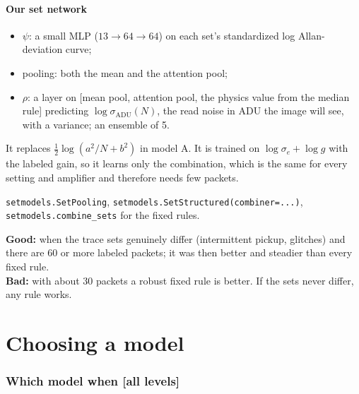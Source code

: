 \documentclass[11pt]{article}
\newcommand{\code}[1]{\texttt{#1}}
\newcommand{\level}[1]{\hfill{\normalfont\small\color{black!60}[#1]}}
\begin{document}
\subsection{Our set network}
\begin{itemize}
\item $\psi$: a small MLP ($13 \to 64 \to 64$) on each set's standardized log Allan-deviation curve;
\item pooling: both the mean and the attention pool;
\item $\rho$: a layer on [mean pool, attention pool, the physics value from the median rule] predicting $\log\sigma_\text{ADU}(N)$, the
  read noise in ADU the image will see, with a variance; an ensemble of 5.
\end{itemize}
It replaces $\tfrac12\log(a^2/N + b^2)$ in model A. It is trained on $\log\sigma_e + \log g$ with the labeled gain, so it learns only
the combination, which is the same for every setting and amplifier and therefore needs few packets.

\begin{ours}
\code{setmodels.SetPooling}, \code{setmodels.SetStructured(combiner=...)}, \code{setmodels.combine\_sets} for the fixed rules.
\end{ours}

\begin{when}
\textbf{Good:} when the trace sets genuinely differ (intermittent pickup, glitches) and there are 60 or more labeled packets; it was
then better and steadier than every fixed rule.\\
\textbf{Bad:} with about 30 packets a robust fixed rule is better. If the sets never differ, any rule works.
\end{when}

\part{Choosing a model}

\section{Which model when \level{all levels}}
\label{sec:choose}
\end{document}
